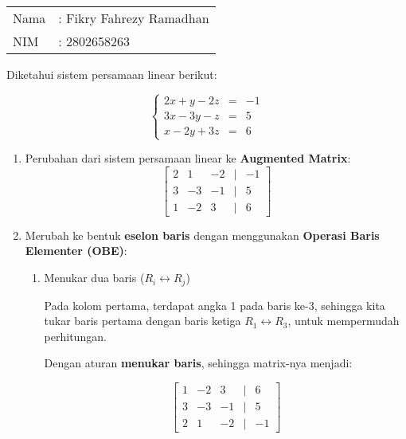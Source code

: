 \documentclass{article}
\begin{document}
\pagestyle{empty}

\begin{tabular}{@{}l l@{}}
Nama & : Fikry Fahrezy Ramadhan \\
NIM & : 2802658263 \\
\end{tabular}

\vspace{1em}

Diketahui sistem persamaan linear berikut:

\[
\left\{
\begin{array}{rcl}
2x + y - 2z &=& -1 \\
3x - 3y - z &=& 5 \\
x - 2y + 3z &=& 6
\end{array}
\right.
\]

\begin{enumerate}
    \item Perubahan dari sistem persamaan linear ke \textbf{Augmented Matrix}:
    \[
    \begin{bmatrix}
    2 & 1 & -2 & \vert & -1 \\
    3 & -3 & -1 & \vert & 5 \\
    1 & -2 & 3 & \vert & 6
    \end{bmatrix}
    \]
    \item Merubah ke bentuk \textbf{eselon baris} dengan menggunakan \textbf{Operasi Baris Elementer (OBE)}:

    \begin{enumerate}
        \item Menukar dua baris (\(R_i \leftrightarrow R_j\))
        
        \vspace{1em}

        Pada kolom pertama, terdapat angka 1 pada baris ke-3, sehingga kita tukar baris pertama dengan baris ketiga \(R_1 \leftrightarrow R_3\), untuk mempermudah perhitungan.

        Dengan aturan \textbf{menukar baris}, sehingga matrix-nya menjadi:

        \[
        \begin{bmatrix}
        1 & -2 & 3 & \vert & 6 \\
        3 & -3 & -1 & \vert & 5 \\
        2 & 1 & -2 & \vert & -1
        \end{bmatrix}
        \]

        \vspace{1em}


\end{enumerate}
\end{enumerate}
\end{document}
